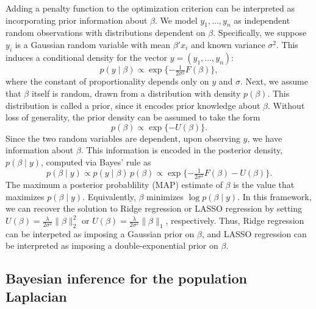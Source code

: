 \documentclass[12pt]{article}
\theoremstyle{plain}
\begin{document}
Adding a penalty function to the optimization criterion can be
interpreted as incorporating prior information about $\beta$.  We
model $y_1, \dotsc, y_n$ as independent random observations with
distributions dependent on $\beta$.  Specifically, we suppose $y_i$ is
a Gaussian random variable with mean $\beta' x_i$ and known variance
$\sigma^2$.  This induces a conditional density for the vector
$y = (y_1, \dotsc, y_n)$:
\begin{equation}\label{E:regression-density}
  p(y \mid \beta)
    \propto
     \exp\{ -\tfrac{1}{2 \sigma^2} F(\beta) \},
\end{equation}
where the constant of proportionality depends only on $y$ and $\sigma$.
Next, we assume that $\beta$ itself is random, drawn from a
distribution with density $p(\beta)$.  This distribution is called a
prior, since it encodes prior knowledge about $\beta$.  Without loss
of generality, the prior density can be assumed to take the form
\begin{equation}\label{E:regression-prior}
  p(\beta) \propto \exp\{ -U(\beta) \}.
\end{equation}
Since the two random variables are dependent, upon observing $y$, we
have information about $\beta$.  This information is encoded in the
posterior density, $p(\beta \mid y)$, computed via Bayes' rule as
\begin{equation}\label{E:regression-posterior}
  p(\beta \mid y)
    \propto p(y \mid \beta) \, p(\beta)
    \propto \exp\{ -\tfrac{1}{2 \sigma^2} F(\beta) - U(\beta) \}.
\end{equation}
The maximum a posterior probablility (MAP) estimate of $\beta$ is the value 
that maximizes $p(\beta \mid y)$.  
Equivalently, $\beta$ minimizes $\log p(\beta \mid y)$.  
In this framework, we can recover the solution to Ridge regression or LASSO 
regression by setting
$U(\beta) = \tfrac{\lambda}{2 \sigma^2} \| \beta \|_2^2$ or
$U(\beta) = \tfrac{\lambda}{2 \sigma^2} \| \beta \|_1$, respectively.  
Thus, Ridge regression can be interpeted as imposing a Gaussian prior on 
$\beta$, and LASSO regression can be interpreted as imposing a 
double-exponential prior on $\beta$.


\subsection{Bayesian inference for the population Laplacian}
\label{S:bayesian-laplacian}
\end{document}
